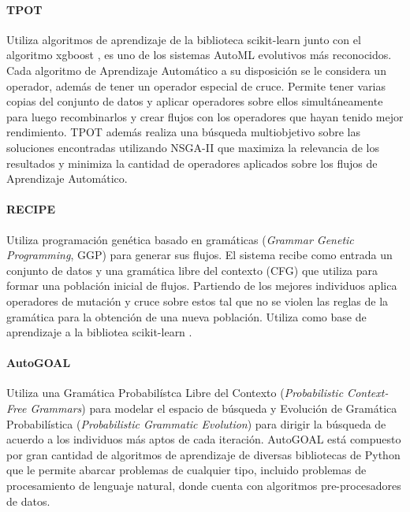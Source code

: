 \paragraph*{TPOT } Utiliza algoritmos de aprendizaje de la biblioteca scikit-learn  junto con el algoritmo xgboost , es uno de los sistemas AutoML evolutivos m\'as reconocidos. Cada algoritmo de Aprendizaje Autom\'atico a su disposici\'on se le considera un operador, adem\'as de tener un operador especial de cruce. Permite tener varias copias del conjunto de datos y aplicar operadores sobre ellos simult\'aneamente para luego recombinarlos y crear flujos con los operadores que hayan tenido mejor rendimiento. TPOT adem\'as realiza una b\'usqueda multiobjetivo sobre las soluciones encontradas utilizando NSGA-II  que maximiza la relevancia de los resultados y minimiza la cantidad de operadores aplicados sobre los flujos de Aprendizaje Autom\'atico. %

\paragraph*{RECIPE } Utiliza programaci\'on gen\'etica basado en gram\'aticas (\textit{Grammar Genetic Programming}, GGP) para generar sus flujos. El sistema recibe como entrada un conjunto de datos y una gram\'atica libre del contexto (CFG) que utiliza para formar una poblaci\'on inicial de flujos. Partiendo de los mejores individuos aplica operadores de mutaci\'on y cruce sobre estos tal que no se violen las reglas de la gram\'atica para la obtenci\'on de una nueva poblaci\'on. Utiliza como base de aprendizaje a la bibliotea scikit-learn .
 

\paragraph{AutoGOAL } Utiliza una Gram\'atica Probabil\'istca Libre del Contexto (\textit{Probabilistic Context-Free Grammars}) para modelar el espacio de b\'usqueda y Evoluci\'on de Gram\'atica  Probabil\'istica (\textit{Probabilistic Grammatic Evolution})  para dirigir la b\'usqueda de acuerdo a los individuos m\'as aptos de cada iteraci\'on. AutoGOAL est\'a compuesto por gran cantidad de algoritmos de aprendizaje de diversas bibliotecas de Python que le  permite abarcar problemas de cualquier tipo, incluido problemas de procesamiento de lenguaje natural, donde cuenta con algoritmos pre-procesadores de datos.

